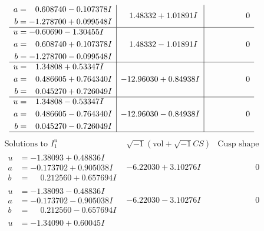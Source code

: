 \documentclass[1p]{elsarticle_modified}
\theoremstyle{definition}
\newcommand{\I}{\sqrt{-1}}
\begin{document}
$$\begin{array}{c|c|c}
\begin{aligned}
a &= \phantom{-}0.608740 - 0.107378 I \\
b &= -1.278700 + 0.099548 I\end{aligned}
 & \phantom{-}1.48332 + 1.01891 I & \phantom{-0.000000 } 0 \\ \hline\begin{aligned}
u &= -0.60690 - 1.30455 I \\
a &= \phantom{-}0.608740 + 0.107378 I \\
b &= -1.278700 - 0.099548 I\end{aligned}
 & \phantom{-}1.48332 - 1.01891 I & \phantom{-0.000000 } 0 \\ \hline\begin{aligned}
u &= \phantom{-}1.34808 + 0.53347 I \\
a &= \phantom{-}0.486605 + 0.764340 I \\
b &= \phantom{-}0.045270 + 0.726049 I\end{aligned}
 & -12.96030 + 0.84938 I & \phantom{-0.000000 } 0 \\ \hline\begin{aligned}
u &= \phantom{-}1.34808 - 0.53347 I \\
a &= \phantom{-}0.486605 - 0.764340 I \\
b &= \phantom{-}0.045270 - 0.726049 I\end{aligned}
 & -12.96030 - 0.84938 I & \phantom{-0.000000 } 0\\
 \hline 
 \end{array}$$\newpage$$\begin{array}{c|c|c}  
\text{Solutions to }I^u_{1}& \I (\text{vol} + \sqrt{-1}CS) & \text{Cusp shape}\\
 \hline 
\begin{aligned}
u &= -1.38093 + 0.48836 I \\
a &= -0.173702 + 0.905038 I \\
b &= \phantom{-}0.212560 + 0.657694 I\end{aligned}
 & -6.22030 + 3.10276 I & \phantom{-0.000000 } 0 \\ \hline\begin{aligned}
u &= -1.38093 - 0.48836 I \\
a &= -0.173702 - 0.905038 I \\
b &= \phantom{-}0.212560 - 0.657694 I\end{aligned}
 & -6.22030 - 3.10276 I & \phantom{-0.000000 } 0 \\ \hline\begin{aligned}
u &= -1.34090 + 0.60045 I \\

\end{aligned}
\end{array}$$
\end{document}
